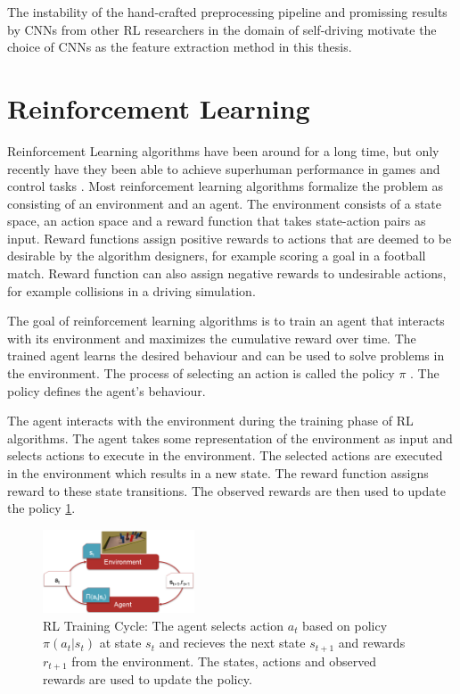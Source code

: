 The instability of the hand-crafted preprocessing pipeline and promissing results by CNNs from other RL researchers in the domain of self-driving \autocite{neptune} motivate the choice of CNNs as the feature extraction method in this thesis. 


\section{Reinforcement Learning}


Reinforcement Learning algorithms have been around for a long time, but only recently have they been able to achieve superhuman performance in games and control tasks \autocite{atari}. Most reinforcement learning algorithms formalize the problem as consisting of an environment and an agent. The environment consists of a state space, an action space and a reward function that takes state-action pairs as input. Reward functions assign positive rewards to actions that are deemed to be desirable by the algorithm designers, for example scoring a goal in a football match. Reward function can also assign negative rewards to undesirable actions, for example collisions in a driving simulation. 

The goal of reinforcement learning algorithms is to train an agent that interacts with its environment and maximizes the cumulative reward over time. The trained agent learns the desired behaviour and can be used to solve problems in the environment. The process of selecting an action is called the policy $\pi$ \autocite{rlbook2020}. The policy defines the agent's behaviour.

The agent interacts with the environment during the training phase of RL algorithms. The agent takes some representation of the environment as input and selects actions to execute in the environment. The selected actions are executed in the environment which results in a new state. The reward function assigns reward to these state transitions.
The observed rewards are then used to update the policy \ref{fig:rlcycle}.

\begin{figure}
    \centering
    \includegraphics[width=0.4\textwidth]{Bilder/rl_cycle.png}
    \caption{RL Training Cycle: The agent selects action $a_t$ based on policy $\pi(a_t|s_t)$ at state $s_t$ and recieves the next state $s_{t+1}$ and rewards $r_{t+1}$ from the environment. The states, actions and observed rewards are used to update the policy.}
    \label{fig:rlcycle}
\end{figure}

